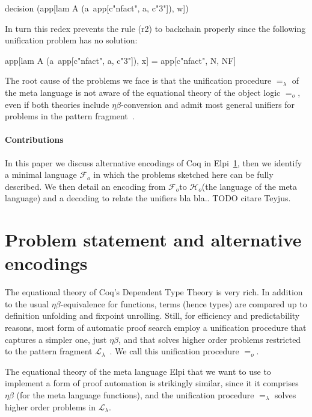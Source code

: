 \documentclass[sigconf,natbib=false]{acmart}
\newcommand{\U}{\ensuremath{=_o}\xspace}
\newcommand{\Ue}{\ensuremath{=_\lambda}\xspace}
\newcommand{\Fo}{\ensuremath{\mathcal{F}_{\!o}\xspace}}
\newcommand{\Ho}{\ensuremath{\mathcal{H}_o}\xspace}
\begin{document}
\begin{elpicode}
decision (app[lam A (a\ app[c"nfact", a, c"3"]), w])
\end{elpicode}

\noindent
In turn this redex prevents the rule (r2) to backchain properly since
the following unification problem has no solution:

\begin{elpicode}
app[lam A (a\ app[c"nfact", a, c"3"]), x] =
app[c"nfact", N, NF]
\end{elpicode}

\noindent
The root cause of the problems we face is that the unification procedure
\Ue of the meta language is not aware of the equational theory of the object
logic \U, even if both theories include $\eta\beta$-conversion and admit most general
unifiers for problems in the pattern fragment~\cite{miller92jsc}.

\paragraph{Contributions}
In this paper we discuss alternative encodings of Coq in
Elpi~\ref{sec:encodings}, then we identify a minimal language \Fo
in which the problems sketched here can be fully described.
We then detail an encoding  from \Fo to \Ho (the language of
the meta language) and a decoding  to relate the unifiers
bla bla.. TODO citare Teyjus.

\section{Problem statement and alternative encodings} %
\label{sec:encodings}

The equational theory of Coq's Dependent Type Theory is very rich. In
addition to the usual $\eta\beta$-equivalence for functions, terms (hence types)
are compared up to definition unfolding and fixpoint unrolling. Still,
for efficiency and predictability reasons, most form of automatic proof search
employ a unification procedure that captures a simpler one,
just $\eta\beta$, and that solves higher order problems
restricted to the pattern fragment $\mathcal{L}_\lambda$~\cite{miller92jsc}.
We call this unification procedure \U{}.

The equational theory of the meta language Elpi that we want to use to
implement a form of proof automation is strikingly similar, since it
it comprises $\eta\beta$ (for the meta language functions), and the
unification procedure \Ue{} solves higher order problems in
$\mathcal{L}_\lambda$.
\end{document}
